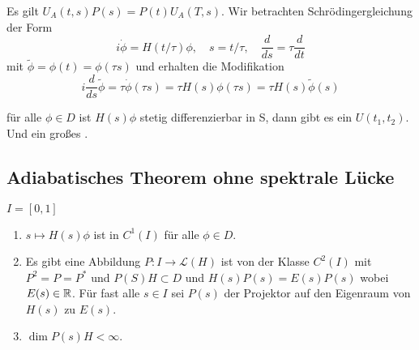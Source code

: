 \documentclass{mycourse}
\begin{document}
Es gilt $U_A(t,s) P(s)=P(t) U_A(T,s)$. Wir betrachten Schrödingergleichung der Form
\[
i \dot \phi = H(t/ \tau) \phi, \quad s=t/\tau, \quad \frac{d}{ds} = \tau \frac{d}{dt}
\]
mit $\tilde \phi = \phi(t) = \phi(\tau s)$ und erhalten die Modifikation
\[
i \frac{d}{ds} \tilde \phi = \tau \dot \phi (\tau s) = \tau H(s)  \phi(\tau s) = \tau H(s) \tilde \phi(s)
\]

\begin{seg}[Annahme]
für alle $\phi \in D$ ist $H(s) \phi$ stetig differenzierbar in S, dann gibt es ein $U(t_1, t_2)$.
Und ein großes \fixme[fig2].
\end{seg}

\subsection{Adiabatisches Theorem ohne spektrale Lücke}

\begin{seg}[Annahmen]
$I=[0,1]$
\begin{enumerate}[i]
\item $s\mapsto H(s) \phi$ ist in $C^1(I)$ für alle $\phi \in D$.
\item Es gibt eine Abbildung $P: I \to \mathcal L(H)$ ist von der Klasse $C^2(I)$ mit $P^2= P= P^*$ und $P(S) H \subset D$ und $H(s) P(s)= E(s) P(s)$ wobei $E(s) \in \mathbb{R}$. Für fast alle $s\in I$ sei $P(s)$ der Projektor auf den Eigenraum von $H(s)$ zu $E(s)$.
\item $\dim P(s) H < \infty$.
\end{enumerate}
\end{seg}
\end{document}
